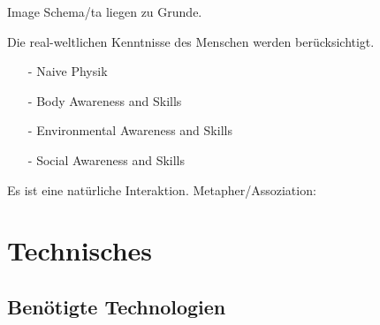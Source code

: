\checkbox{\imageschemata} Image Schema/ta liegen zu Grunde.
\begin{itemize}
\end{itemize}

\checkbox{\realworld} Die real-weltlichen Kenntnisse des Menschen werden berücksichtigt.
\begin{itemize}
\item[-] \checkbox{\realworldNaivePhysic} Naive Physik
\item[-] \checkbox{\realworldBodyAwareness} Body Awareness and Skills
\item[-] \checkbox{\realworldEnvironmentAwareness} Environmental Awareness and Skills
\item[-] \checkbox{\realworldSocialAwareness} Social Awareness and Skills
\end{itemize}

\checkbox{\metaphor} Es ist eine natürliche Interaktion. Metapher/Assoziation: \metaphordesc


\section*{Technisches}

\subsection*{Benötigte Technologien}
\requiredTechnologies

